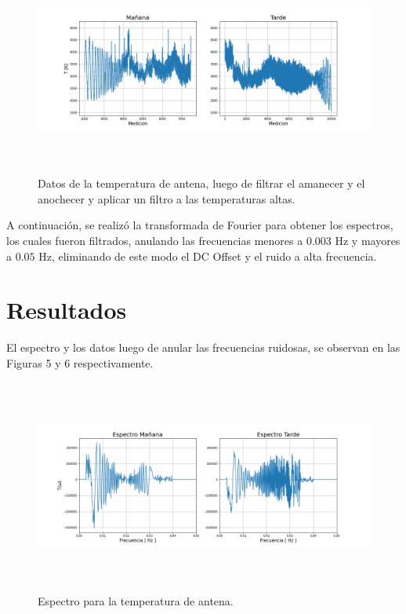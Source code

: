 \documentclass[letterpaper,oneside]{article}
\begin{document}
\begin{figure}
  \centering
  \includegraphics[height=7cm]{../graficos/primerfiltro.png}
  \caption{Datos de la temperatura de antena, luego de filtrar el amanecer y el anochecer y aplicar un filtro a las temperaturas altas.}
\end{figure}

A continuación, se realizó la transformada de Fourier para obtener los espectros, los cuales fueron filtrados, anulando las frecuencias menores a $0.003$ Hz y mayores a $0.05$ Hz, eliminando de este modo el DC Offset y el ruido a alta frecuencia.

\section{Resultados}
El espectro y los datos luego de anular las frecuencias ruidosas, se observan en las Figuras 5 y 6 respectivamente.

\begin{figure}
  \centering
  \includegraphics[height=7cm]{../graficos/cleanespectros.png}
  \caption{Espectro para la temperatura de antena.}
\end{figure}
\end{document}
